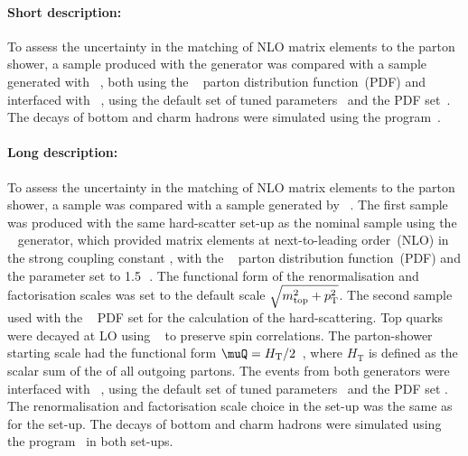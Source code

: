 \paragraph{Short description:}

To assess the uncertainty in the matching of NLO matrix elements to the
parton shower, a sample produced with the
\POWHEGBOX[v2]
generator was compared with a sample generated with \MGNLO[2.6.0]~\cite{Alwall:2014hca}, both using the 
\NNPDF[3.0nlo]~\cite{Ball:2014uwa} parton distribution function~(PDF) and interfaced with
\HERWIG[7.13]~\cite{Bahr:2008pv,Bellm:2015jjp}, using the \HERWIG[7.1] default set of 
tuned parameters~\cite{Bellm:2015jjp} and the \MMHT[lo] PDF set~\cite{Harland-Lang:2014zoa}.
The decays of bottom and charm hadrons
were simulated using the \EVTGEN[1.6.0] program~\cite{Lange:2001uf}. 


\paragraph{Long description:}

To assess the uncertainty in the matching of NLO matrix elements to the parton shower, 
a \POWHEG sample was compared with a sample generated by \MGNLO~\cite{Alwall:2014hca}. 
The first sample was produced with the same hard-scatter set-up as the nominal sample using the 
\POWHEGBOX[v2]~\cite{Frixione:2007nw,Nason:2004rx,Frixione:2007vw,Alioli:2010xd}
generator, which provided matrix elements at next-to-leading
order~(NLO) in the strong coupling constant \alphas, with the
\NNPDF[3.0nlo]~\cite{Ball:2014uwa} parton distribution function~(PDF) and
the \hdamp parameter set to 1.5\,\mtop~\cite{ATL-PHYS-PUB-2016-020}.
The functional form of the renormalisation and factorisation scales was
set to the default scale $\sqrt{m_{\textrm{top}}^2 + p_{\textrm T}^2}$.  
The second sample used \MGNLO[2.6.0] with the 
\NNPDF[3.0nlo]~\cite{Ball:2014uwa} PDF set for the calculation of the hard-scattering.
Top quarks were decayed at LO using
\MADSPIN~\cite{Frixione:2007zp,Artoisenet:2012st} to preserve spin
correlations. The parton-shower starting
scale had the functional form $\muQ = H_{\mathrm T}/2$~\cite{ATL-PHYS-PUB-2017-007}, 
where $H_{\mathrm T}$ is defined
as the scalar sum of the \pT of all outgoing partons.
The events from both generators were interfaced with
\HERWIG[7.13]~\cite{Bahr:2008pv,Bellm:2015jjp}, using the \HERWIG[7.1] default set
of tuned parameters~\cite{Bellm:2015jjp} and the \MMHT[lo] PDF set
\cite{Harland-Lang:2014zoa}.
The renormalisation and factorisation scale choice in the \MGNLO set-up was the same as for the
\POWHEGBOX set-up. The decays of bottom and charm hadrons were simulated
using the \EVTGEN[1.6.0] program~\cite{Lange:2001uf} in both set-ups.


